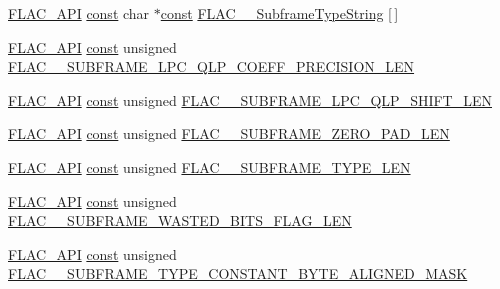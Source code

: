 \begin{DoxyCompactItemize}
\item 
\hyperlink{group__flac__export_ga56ca07df8a23310707732b1c0007d6f5}{F\+L\+A\+C\+\_\+\+A\+PI} \hyperlink{zconf_8h_a2c212835823e3c54a8ab6d95c652660e}{const} char $\ast$\hyperlink{zconf_8h_a2c212835823e3c54a8ab6d95c652660e}{const} \hyperlink{group__flac__format_gabc358f252630dfc52e875eb05c3b0fd9}{F\+L\+A\+C\+\_\+\+\_\+\+Subframe\+Type\+String} \mbox{[}$\,$\mbox{]}
\item 
\hyperlink{group__flac__export_ga56ca07df8a23310707732b1c0007d6f5}{F\+L\+A\+C\+\_\+\+A\+PI} \hyperlink{zconf_8h_a2c212835823e3c54a8ab6d95c652660e}{const} unsigned \hyperlink{group__flac__format_ga1d983d775b492e968719457694737116}{F\+L\+A\+C\+\_\+\+\_\+\+S\+U\+B\+F\+R\+A\+M\+E\+\_\+\+L\+P\+C\+\_\+\+Q\+L\+P\+\_\+\+C\+O\+E\+F\+F\+\_\+\+P\+R\+E\+C\+I\+S\+I\+O\+N\+\_\+\+L\+EN}
\item 
\hyperlink{group__flac__export_ga56ca07df8a23310707732b1c0007d6f5}{F\+L\+A\+C\+\_\+\+A\+PI} \hyperlink{zconf_8h_a2c212835823e3c54a8ab6d95c652660e}{const} unsigned \hyperlink{group__flac__format_ga07ee16744f0933eaa665cec8f2ec5631}{F\+L\+A\+C\+\_\+\+\_\+\+S\+U\+B\+F\+R\+A\+M\+E\+\_\+\+L\+P\+C\+\_\+\+Q\+L\+P\+\_\+\+S\+H\+I\+F\+T\+\_\+\+L\+EN}
\item 
\hyperlink{group__flac__export_ga56ca07df8a23310707732b1c0007d6f5}{F\+L\+A\+C\+\_\+\+A\+PI} \hyperlink{zconf_8h_a2c212835823e3c54a8ab6d95c652660e}{const} unsigned \hyperlink{group__flac__format_ga11cc163e6aea53e590708bba61a01162}{F\+L\+A\+C\+\_\+\+\_\+\+S\+U\+B\+F\+R\+A\+M\+E\+\_\+\+Z\+E\+R\+O\+\_\+\+P\+A\+D\+\_\+\+L\+EN}
\item 
\hyperlink{group__flac__export_ga56ca07df8a23310707732b1c0007d6f5}{F\+L\+A\+C\+\_\+\+A\+PI} \hyperlink{zconf_8h_a2c212835823e3c54a8ab6d95c652660e}{const} unsigned \hyperlink{group__flac__format_ga1b8b7ac39c55c0fc7973821cd4297104}{F\+L\+A\+C\+\_\+\+\_\+\+S\+U\+B\+F\+R\+A\+M\+E\+\_\+\+T\+Y\+P\+E\+\_\+\+L\+EN}
\item 
\hyperlink{group__flac__export_ga56ca07df8a23310707732b1c0007d6f5}{F\+L\+A\+C\+\_\+\+A\+PI} \hyperlink{zconf_8h_a2c212835823e3c54a8ab6d95c652660e}{const} unsigned \hyperlink{group__flac__format_ga86d93adcc6b7f67eaecd19e5c3fbdfcf}{F\+L\+A\+C\+\_\+\+\_\+\+S\+U\+B\+F\+R\+A\+M\+E\+\_\+\+W\+A\+S\+T\+E\+D\+\_\+\+B\+I\+T\+S\+\_\+\+F\+L\+A\+G\+\_\+\+L\+EN}
\item 
\hyperlink{group__flac__export_ga56ca07df8a23310707732b1c0007d6f5}{F\+L\+A\+C\+\_\+\+A\+PI} \hyperlink{zconf_8h_a2c212835823e3c54a8ab6d95c652660e}{const} unsigned \hyperlink{group__flac__format_gadbf7a91c50f42a246aa1db9bd61bac16}{F\+L\+A\+C\+\_\+\+\_\+\+S\+U\+B\+F\+R\+A\+M\+E\+\_\+\+T\+Y\+P\+E\+\_\+\+C\+O\+N\+S\+T\+A\+N\+T\+\_\+\+B\+Y\+T\+E\+\_\+\+A\+L\+I\+G\+N\+E\+D\+\_\+\+M\+A\+SK}

\end{DoxyCompactItemize}
